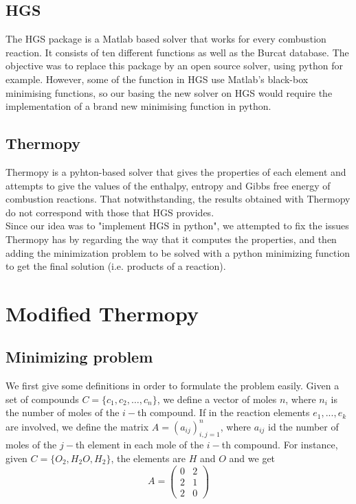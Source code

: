 \documentclass[a4paper,10pt]{article}
\theoremstyle{plain}
\theoremstyle{definition}
\theoremstyle{remark}
\begin{document}
\subsection{HGS}
The HGS package is a Matlab based solver that works for every combustion reaction. It consists of ten different functions as well as the Burcat database. The objective was to replace this package by an open source solver, using python for example. However, some of the function in HGS use Matlab's black-box minimising functions, so our basing the new solver on HGS would require the implementation of a brand new minimising function in python.
\subsection{Thermopy}
Thermopy is a pyhton-based solver that gives the properties of each element and attempts to give the values of the enthalpy, entropy and Gibbs free energy of combustion reactions. That notwithstanding, the results obtained with Thermopy do not correspond with those that HGS provides.\\ 
Since our idea was to "implement HGS in python", we attempted to fix the issues Thermopy has by regarding the way that it computes the properties, and then adding the minimization problem to be solved with a python minimizing function to get the final solution (i.e. products of a reaction).

\section{Modified Thermopy}

\subsection{Minimizing problem}
We first give some definitions in order to formulate the problem easily. Given a set of compounds $C = \{c_1,c_2,\dots,c_n\} $, we define a vector of moles $n$, where $n_i$ is the number of moles of the $i-$th compound. 
If in the reaction elements $e_{1},...,e_{k}$ are involved, we define the matrix $A=(a_{ij})_{i,j=1}^n$, where $a_{ij}$ id the number of moles of the $j-$th element in each mole of the $i-$th compound.
For instance, given $C = \{O_2,H_2O,H_2\}$, the elements are $H$ and $O$ and we get
\begin{equation*}
A = \begin{pmatrix}0&2\\ 2&1\\ 2&0
\end{pmatrix}
\end{equation*}
\end{document}
